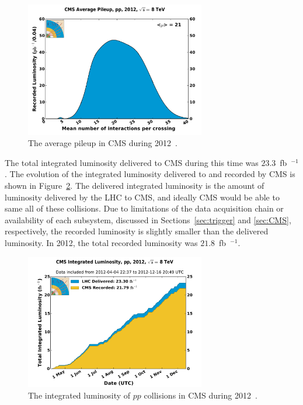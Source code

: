 \begin{figure}[ht]
 \begin{center}
    \includegraphics[width=0.70\textwidth]{figures/experiment/pileup_pp_2012.pdf}
      \end{center}
\caption{The average pileup in CMS during 2012~\cite{CMS:lumi}.}
\label{fig:pileup2012}
\end{figure}

The total integrated luminosity delivered to CMS during this time was $23.3$~fb~$^{-1}$.
The evolution of the integrated luminosity delivered to and recorded by CMS is shown in
Figure~\ref{fig:integratedlumi2012}. The delivered integrated luminosity is the amount of
luminosity delivered by the LHC to CMS, and ideally CMS would be able to same all of these collisions.
Due to limitations of the data acquisition chain or availability of each subsystem, discussed in
Sections~\ref{sec:trigger} and \ref{sec:CMS}, respectively, the recorded luminosity
is slightly smaller than the delivered luminosity.
In 2012, the total recorded luminosity was $21.8$~fb~$^{-1}$.

\begin{figure}[ht]
 \begin{center}
    \includegraphics[width=0.70\textwidth]{figures/experiment/int_lumi_per_day_cumulative_pp_2012.pdf}
      \end{center}
\caption{The integrated luminosity of $pp$ collisions in CMS during 2012~\cite{CMS:lumi}.}
\label{fig:integratedlumi2012}
\end{figure}

